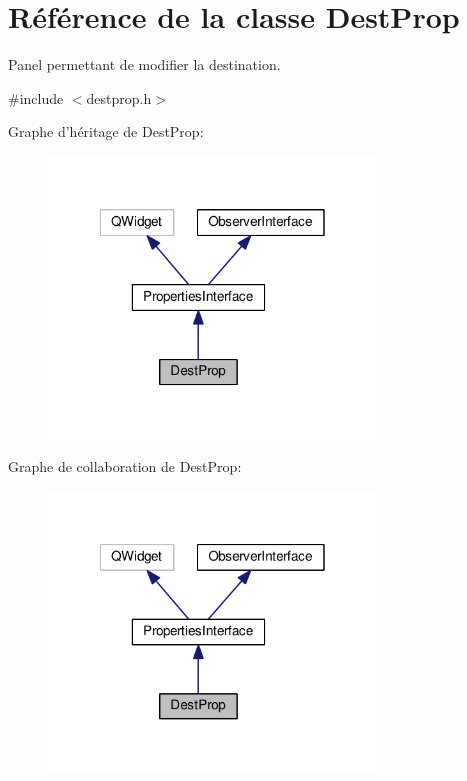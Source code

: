 \hypertarget{classDestProp}{\section{Référence de la classe Dest\+Prop}
\label{classDestProp}
}


Panel permettant de modifier la destination.  




{\ttfamily \#include $<$destprop.\+h$>$}



Graphe d'héritage de Dest\+Prop\+:\nopagebreak
\begin{figure}[H]
\begin{center}
\leavevmode
\includegraphics[width=247pt]{d4/d2d/classDestProp__inherit__graph}
\end{center}
\end{figure}


Graphe de collaboration de Dest\+Prop\+:\nopagebreak
\begin{figure}[H]
\begin{center}
\leavevmode
\includegraphics[width=247pt]{d4/d2b/classDestProp__coll__graph}
\end{center}
\end{figure}
